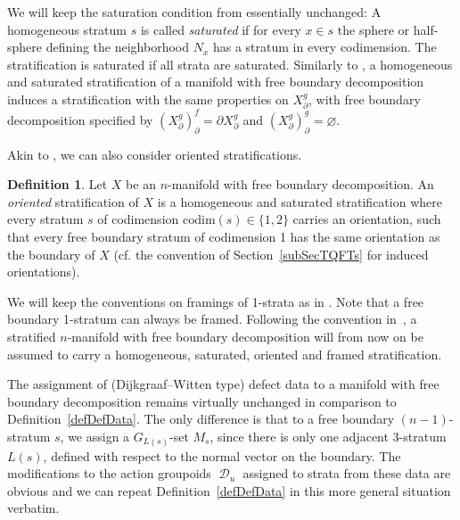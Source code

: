 \documentclass[10pt,a4paper]{amsart}
\DeclareMathOperator{\cald}{\mathcal{D}}
\numberwithin{equation}{section}
\theoremstyle{definition}
\newtheorem{Definition}[Definition]{Definition}
\begin{document}
We will keep the saturation condition from \cite[Definition~3.7]{FMM} essentially unchanged: A homogeneous stratum $s$ is called \textit{saturated} if for every $x \in s$ the sphere or half-sphere defining the neighborhood $N_x$ has a stratum in every codimension. The stratification is saturated if all strata are saturated. Similarly to \cite[Lemma~3.8]{FMM}, a homogeneous and saturated stratification of a manifold with free boundary decomposition induces a stratification with the same properties on $X_{\partial}^g$, with free boundary decomposition specified by $(X_{\partial}^g)_{\partial}^f = \partial X_{\partial}^g$ and $(X_{\partial}^g)_{\partial}^g = \varnothing$.

Akin to \cite[Definition 3.9]{FMM}, we can also consider oriented stratifications.
\begin{Definition}
 \label{defFBOrStr}
 Let $X$ be an $n$-manifold with free boundary decomposition. An \textit{oriented} stratification of $X$ is a homogeneous and saturated stratification where every stratum $s$ of codimension $\mathrm{codim}(s) \in \{1, 2\}$ carries an orientation, such that every free boundary stratum of codimension 1 has the same orientation as the boundary of $X$ (cf. the convention of Section~\ref{subSecTQFTs} for induced orientations).
\end{Definition}
We will keep the conventions on framings of 1-strata as in \cite[Definition~3.10]{FMM}. Note that a free boundary 1-stratum can always be framed.
Following the convention in~\cite{FMM}, a stratified $n$-manifold with free boundary decomposition will from now on be assumed to carry a homogeneous, saturated, oriented and framed stratification.

The assignment of (Dijkgraaf--Witten type) defect data to a manifold with free boundary decomposition remains virtually unchanged in comparison to Definition~\ref{defDefData}. The only difference is that to a free boundary $(n-1)$-stratum $s$, we assign a $G_{L(s)}$-set $M_s$, since there is only one adjacent 3-stratum $L(s)$, defined with respect to the normal vector on the boundary. The modifications to the action groupoids $\cald_u$ assigned to strata from these data are obvious and we can repeat Definition~\ref{defDefData} in this more general situation verbatim.
\end{document}
